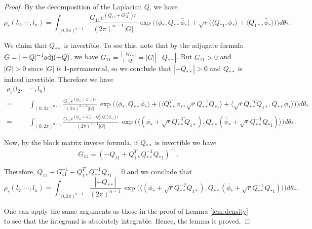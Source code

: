 \documentclass[a4paper, 11pt]{article}
\begin{document}
\begin{proof}
By the decomposition of the Laplacian $Q$, we have
\[\rho_r(l_2, \cdots, l_n)
=\int_{(0,2\pi)^{n-1}}\frac{G_{11} e^{(Q_{11}+G_{11}^{-1})r}}{(2\pi)^{n-1}|G|}\,
\exp\Big(\langle \phi_*, Q_{**}\bar{\phi}_*\rangle
+\sqrt{r}\big(\langle Q_{*1}, \phi_*\rangle+\langle Q_{1*}, \bar{\phi}_*\rangle\big)
\Big)d\theta_*.\]

We claim that $Q_{**}$ is invertible. To see this, note that by the adjugate formula $G=|-Q|^{-1}\textnormal{adj}(-Q)$, we have $G_{11}=\frac{|-Q_{**}|}{|-Q|}=|G||-Q_{**}|$. But $G_{11}>0$ and $|G|>0$ since $|G|$ is 1-permanental, so we conclude that $|-Q_{**}|>0$ and $Q_{**}$ is indeed invertible. Therefore we have
\begin{equation*}
\begin{aligned}
\rho_r(l_2, & \cdots, l_n)\\
=& \int_{(0,2\pi)^{n-1}}\frac{G_{11} e^{(Q_{11}+G_{11}^{-1})r}}{(2\pi)^{n-1}|G|}\,
\exp\bigg(\langle \phi_*, Q_{**}\bar{\phi}_*\rangle
+\big( \langle Q_{**}^T\phi_*, \sqrt{r}Q_{**}^{-1}Q_{*1}\rangle+\langle \sqrt{r}Q_{**}^{-T}Q_{1*}, Q_{**}\bar{\phi}_*\rangle\big)
\bigg)d\theta_*\\
=& \int_{(0,2\pi)^{n-1}}\frac{G_{11} e^{(Q_{11}+G_{11}^{-1}-Q_{1*}^T Q_{**}^{-1}Q_{*1})r}}{(2\pi)^{n-1}|G|}\,
\exp\bigg(\langle (\phi_*+ \sqrt{r}Q_{**}^{-T}Q_{1*}), Q_{**}(\bar{\phi}_*+ \sqrt{r}Q_{**}^{-1}Q_{*1})\rangle\bigg)d\theta_*.
\end{aligned}
\end{equation*}

Now, by the block matrix inverse formula, if $Q_{**}$ is invertible we have
\[G_{11}=(-Q_{11}+Q_{1*}^TQ_{**}^{-1}Q_{*1})^{-1}.\]

Therefore, $Q_{11}+G_{11}^{-1}-Q_{1*}^TQ_{**}^{-1}Q_{*1}=0$ and we conclude that
\[\rho_r(l_2, \cdots, l_n)=\int_{(0,2\pi)^{n-1}}\frac{|-Q_{**}|}{(2\pi)^{n-1}}\,
\exp\bigg(\langle (\phi_*+ \sqrt{r}Q_{**}^{-T}Q_{1*}), Q_{**}(\bar{\phi}_*+ \sqrt{r}Q_{**}^{-1}Q_{*1})\rangle\bigg)d\theta_*.\]

One can apply the same arguments as those in the proof of Lemma \ref{lem:density} to see that the integrand is absolutely integrable. Hence, the lemma is proved.
\end{proof}
\end{document}
